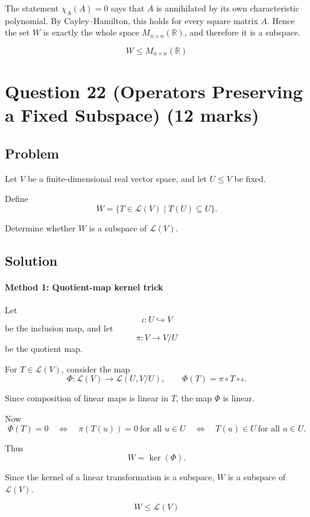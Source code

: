\documentclass[12pt]{article}
\begin{document}
The statement \(\chi_A(A)=0\) says that \(A\) is annihilated by its own characteristic polynomial. By Cayley--Hamilton, this holds for every square matrix \(A\). Hence the set \(W\) is exactly the whole space \(M_{n\times n}(\mathbb R)\), and therefore it is a subspace.

\[
\boxed{W\le M_{n\times n}(\mathbb R)}
\]

\newpage
\section{Question 22 (Operators Preserving a Fixed Subspace) \hfill (12 marks)}
\subsection{Problem}

Let \(V\) be a finite-dimensional real vector space, and let \(U\le V\) be fixed.

Define
\[
W=\{T\in\mathcal L(V)\mid T(U)\subseteq U\}.
\]

Determine whether \(W\) is a subspace of \(\mathcal L(V)\).

\subsection{Solution}

\paragraph{Method 1: Quotient-map kernel trick}

Let
\[
\iota:U\hookrightarrow V
\]
be the inclusion map, and let
\[
\pi:V\to V/U
\]
be the quotient map.

For \(T\in\mathcal L(V)\), consider the map
\[
\Phi:\mathcal L(V)\to\mathcal L(U,V/U),\qquad
\Phi(T)=\pi\circ T\circ \iota.
\]

Since composition of linear maps is linear in \(T\), the map \(\Phi\) is linear.

Now
\[
\Phi(T)=0
\quad\Longleftrightarrow\quad
\pi(T(u))=0\ \text{for all }u\in U
\quad\Longleftrightarrow\quad
T(u)\in U\ \text{for all }u\in U.
\]

Thus
\[
W=\ker(\Phi).
\]

Since the kernel of a linear transformation is a subspace, \(W\) is a subspace of \(\mathcal L(V)\).

\[
\boxed{W\le \mathcal L(V)}
\]
\end{document}
